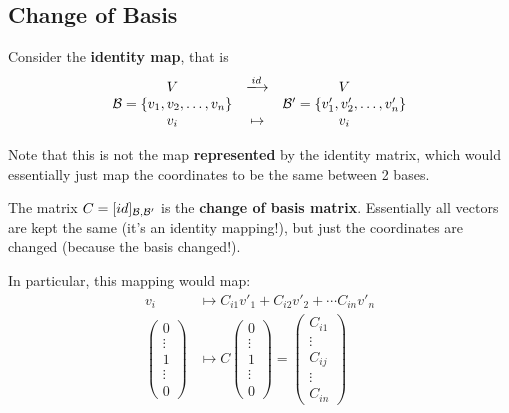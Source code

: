 
\subsection{Change of Basis}

Consider the \textbf{identity map}, that is
\[
    \begin{array}{ccc}
        V                               & \xlongrightarrow{id} & V                                   \\
        \calb = \{v_1, v_2, \dots, v_n\} &                      & \calb '= \{v'_1, v'_2, \dots, v'_n\} \\
        v_i                             & \mapsto              & v_i
    \end{array}
\]

Note that this is not the map \textbf{represented} by the identity matrix, which would essentially just map the coordinates to be the same between 2 bases.

The matrix \(C = [id]_{\mathcal{B}, \mathcal{B} '}\) is the \textbf{change of basis matrix}. Essentially all vectors are kept the same (it's an identity mapping!), but just the coordinates are changed (because the basis changed!).

In particular, this mapping would map:
\begin{align*}
    v_i             & \mapsto C_{i1}v'_1 + C_{i2} v'_2 + \cdots C_{in} v'_n \\
    \begin{pmatrix}
        0      \\
        \vdots \\
        1      \\
        \vdots \\
        0
    \end{pmatrix} & \mapsto C \begin{pmatrix}
                                  0      \\
                                  \vdots \\
                                  1      \\
                                  \vdots \\
                                  0
                              \end{pmatrix} = \begin{pmatrix}
                                                  C_{i1} \\
                                                  \vdots \\
                                                  C_{ij} \\
                                                  \vdots \\
                                                  C_{in}
                                              \end{pmatrix}
\end{align*}

